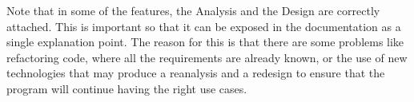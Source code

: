Note that in some of the features, the Analysis and the Design are correctly attached.   This is important so that it can be exposed in the documentation as a single explanation point.  The reason for this is that there are some problems like refactoring code, where all the requirements are already known, or the use of new technologies that may produce a reanalysis and a redesign to ensure that the program will continue having the right use cases.



